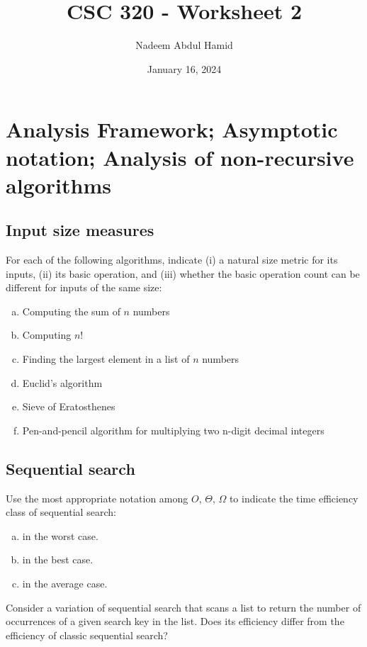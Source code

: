 \documentclass[12pt]{article}
\title{CSC 320 - Worksheet 2}
\author{Nadeem Abdul Hamid}
\date{January 16, 2024}
\begin{document}
\section{Analysis Framework; Asymptotic notation; Analysis of non-recursive algorithms}

\subsection{Input size measures}
For each of the following algorithms, indicate (i) a natural size metric for its inputs, (ii) its basic operation, and (iii) whether the basic operation count can be different for inputs of the same size:

\begin{enumerate}[a.]
    \item Computing the sum of $n$ numbers \vspace{.7in}
    \item Computing $n!$ \vspace{.7in}
    \item Finding the largest element in a list of $n$ numbers \vspace{.75in}
    \item Euclid’s algorithm \vspace{.75in}
    \item Sieve of Eratosthenes \vspace{.75in}
    \item Pen-and-pencil algorithm for multiplying two n-digit decimal integers \vspace{.75in}
\end{enumerate}


\clearpage
\subsection{Sequential search}

Use the most appropriate notation among $O$, $\Theta$, $\Omega$ to indicate the time efficiency class of sequential search:
\begin{enumerate}[a.]
    \item in the worst case.
    \item in the best case.
    \item in the average case.
\end{enumerate}

\vspace{3in}


Consider a variation of sequential search that scans a list to return the number of occurrences of a given search key in the list. Does its efficiency differ from the efficiency of classic sequential search?
\end{document}
